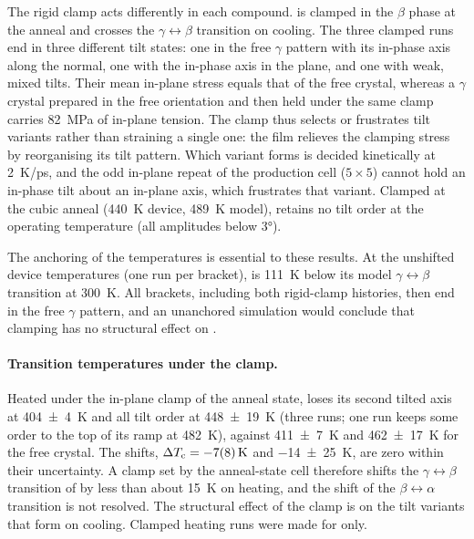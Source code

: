 {The rigid clamp acts differently in each compound. \CsSnI{} is clamped in the $\beta$
phase at the anneal and crosses the $\gamma\leftrightarrow\beta$ transition on cooling. The
three clamped runs end in three different tilt states: one in the free $\gamma$ pattern with
its in-phase axis along the normal, one with the in-phase axis in the plane, and one with
weak, mixed tilts. Their mean in-plane stress equals that of the free crystal, whereas a
$\gamma$ crystal prepared in the free orientation and then held under the same clamp
carries \SI{82}{MPa} of in-plane tension. The clamp thus selects or frustrates tilt
variants rather than straining a single one: the film relieves the clamping stress by
reorganising its tilt pattern. Which variant forms is decided kinetically at \SI{2}{K/ps},
and the odd in-plane repeat of the production cell ($5\times5$) cannot hold an in-phase tilt
about an in-plane axis, which frustrates that variant. Clamped at the cubic anneal
(\SI{440}{K} device, \SI{489}{K} model), \CsSnI{} retains no tilt order at the operating
temperature (all amplitudes below \ang{3}). 

The anchoring of the temperatures is essential to these results. At the unshifted device
temperatures (one run per bracket), \CsSnI{} is \SI{111}{K} below its model
$\gamma\leftrightarrow\beta$ transition at \SI{300}{K}. All brackets, including both
rigid-clamp histories, then end in the free $\gamma$ pattern, and an unanchored simulation
would conclude that clamping has no structural effect on \CsSnI{}.

\paragraph{Transition temperatures under the clamp.}

Heated under the in-plane clamp of the anneal state, \CsSnI{} loses its second tilted axis
at \SI{404 \pm 4}{K} and all tilt order at \SI{448 \pm 19}{K} (three runs; one run keeps
some order to the top of its ramp at \SI{482}{K}), against \SI{411 \pm 7}{K} and
\SI{462 \pm 17}{K} for the free crystal. The shifts, $\dTc = \SI{-7 \pm 8}{K}$ and
\SI{-14 \pm 25}{K}, are zero within their uncertainty. A clamp set by the anneal-state
cell therefore shifts the $\gamma\leftrightarrow\beta$ transition of \CsSnI{} by less than
about \SI{15}{K} on heating, and the shift of the $\beta\leftrightarrow\alpha$ transition is
not resolved. The structural effect of the clamp is on the tilt variants that form on
cooling. Clamped heating runs were made for \CsSnI{} only.

}
